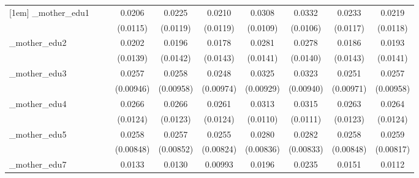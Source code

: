 \begin{table}[htbp]
\begin{tabular}{l*{9}{c}}
[1em]
\_mother\_edu1&                     &                     &      0.0206\sym{*}  &      0.0225\sym{*}  &      0.0210\sym{*}  &      0.0308\sym{***}&      0.0332\sym{***}&      0.0233\sym{**} &      0.0219\sym{*}  \\
            &                     &                     &    (0.0115)         &    (0.0119)         &    (0.0119)         &    (0.0109)         &    (0.0106)         &    (0.0117)         &    (0.0118)         \\
[1em]
\_mother\_edu2&                     &                     &      0.0202         &      0.0196         &      0.0178         &      0.0281\sym{**} &      0.0278\sym{**} &      0.0186         &      0.0193         \\
            &                     &                     &    (0.0139)         &    (0.0142)         &    (0.0143)         &    (0.0141)         &    (0.0140)         &    (0.0143)         &    (0.0141)         \\
[1em]
\_mother\_edu3&                     &                     &      0.0257\sym{***}&      0.0258\sym{***}&      0.0248\sym{**} &      0.0325\sym{***}&      0.0323\sym{***}&      0.0251\sym{***}&      0.0257\sym{***}\\
            &                     &                     &   (0.00946)         &   (0.00958)         &   (0.00974)         &   (0.00929)         &   (0.00940)         &   (0.00971)         &   (0.00958)         \\
[1em]
\_mother\_edu4&                     &                     &      0.0266\sym{**} &      0.0266\sym{**} &      0.0261\sym{**} &      0.0313\sym{***}&      0.0315\sym{***}&      0.0263\sym{**} &      0.0264\sym{**} \\
            &                     &                     &    (0.0124)         &    (0.0123)         &    (0.0124)         &    (0.0110)         &    (0.0111)         &    (0.0123)         &    (0.0124)         \\
[1em]
\_mother\_edu5&                     &                     &      0.0258\sym{***}&      0.0257\sym{***}&      0.0255\sym{***}&      0.0280\sym{***}&      0.0282\sym{***}&      0.0258\sym{***}&      0.0259\sym{***}\\
            &                     &                     &   (0.00848)         &   (0.00852)         &   (0.00824)         &   (0.00836)         &   (0.00833)         &   (0.00848)         &   (0.00817)         \\
[1em]
\_mother\_edu7&                     &                     &      0.0133         &      0.0130         &     0.00993         &      0.0196         &      0.0235\sym{*}  &      0.0151         &      0.0112         \\

\end{tabular}
\end{table}

